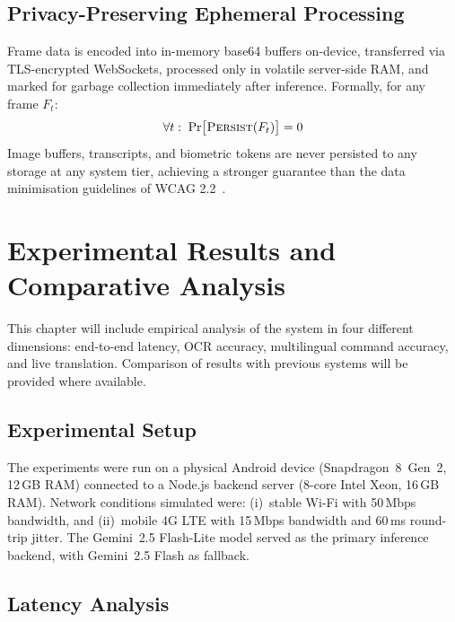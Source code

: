 \documentclass[pdflatex,sn-mathphys-num]{sn-jnl}
\theoremstyle{thmstyleone}%
\theoremstyle{thmstyletwo}%
\theoremstyle{thmstylethree}%
\begin{document}
\subsection{Privacy-Preserving Ephemeral Processing}

Frame data is encoded into in-memory base64 buffers on-device, transferred via
TLS-encrypted WebSockets, processed only in volatile server-side RAM, and marked for
garbage collection immediately after inference. Formally, for any frame $F_t$:
\begin{equation}
  \forall t:\;\Pr\bigl[\textsc{Persist}(F_t)\bigr] = 0
\end{equation}
Image buffers, transcripts, and biometric tokens are never persisted to any storage
at any system tier, achieving a stronger guarantee than the data minimisation
guidelines of WCAG 2.2~\cite{w3c2023wcag}.

\section{Experimental Results and Comparative Analysis}\label{sec:experiments}

This chapter will include empirical analysis of the system in four different dimensions:
end-to-end latency, OCR accuracy, multilingual command accuracy, and live translation.
Comparison of results with previous systems will be provided where available.

\subsection{Experimental Setup}

The experiments were run on a physical Android device (Snapdragon~8~Gen~2,
12\,GB RAM) connected to a Node.js backend server (8-core Intel Xeon, 16\,GB RAM).
Network conditions simulated were: (i)~stable Wi-Fi with 50\,Mbps bandwidth, and
(ii)~mobile 4G LTE with 15\,Mbps bandwidth and 60\,ms round-trip jitter. The
Gemini~2.5 Flash-Lite model served as the primary inference backend, with
Gemini~2.5 Flash as fallback.

\subsection{Latency Analysis}
\end{document}
